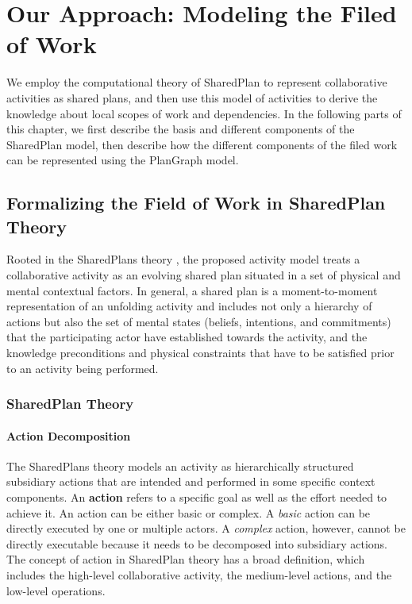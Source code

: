 \graphicspath{{Figures/}}

\chapter{Our Approach: Modeling the Filed of Work} %
\label{cha:field_of_work}

We employ the computational theory of SharedPlan \cite{grosz1996collaborative,Grosz98theevolution} to represent collaborative activities as shared plans, and then use this model of activities to derive the knowledge about local scopes of work and dependencies. In the following parts of this chapter, we first describe the basis and different components of the SharedPlan model, then describe how the different components of the filed work can be represented using the PlanGraph model.

\section{Formalizing the Field of Work in SharedPlan Theory}
Rooted in the SharedPlans theory \cite{grosz1996collaborative,Grosz98theevolution}, the proposed activity model treats a collaborative activity as an evolving shared plan situated in a set of physical and mental contextual factors. In general, a shared plan is a moment-to-moment representation of an unfolding activity and includes not only a hierarchy of actions but also the set of mental states (beliefs, intentions, and commitments) that the participating actor have established towards the activity, and the knowledge preconditions and physical constraints that have to be satisfied prior to an activity being performed.

\subsection {SharedPlan Theory}
\subsubsection*{Action Decomposition}
The SharedPlans theory models an activity as hierarchically structured subsidiary actions that are intended and performed in some specific context components. An \textbf{action} refers to a specific goal as well as the effort needed to achieve it. An action can be either basic or complex. A \emph{basic} action can be directly executed by one or multiple actors. A \emph{complex} action, however, cannot be directly executable because it needs to be decomposed into subsidiary actions. The concept of action in SharedPlan theory has a broad definition, which includes the high-level collaborative activity, the medium-level actions, and the low-level operations.

